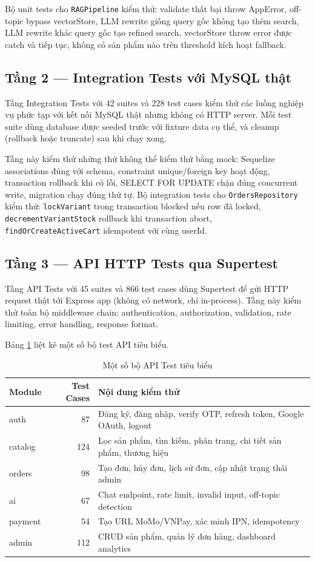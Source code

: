 Bộ unit tests cho \texttt{RAGPipeline} kiểm thử: validate thất bại throw AppError, off-topic bypass vectorStore, LLM rewrite giống query gốc không tạo thêm search, LLM rewrite khác query gốc tạo refined search, vectorStore throw error được catch và tiếp tục, không có sản phẩm nào trên threshold kích hoạt fallback.

\subsection{Tầng 2 — Integration Tests với MySQL thật}

Tầng Integration Tests với 42 suites và 228 test cases kiểm thử các luồng nghiệp vụ phức tạp với kết nối MySQL thật nhưng không có HTTP server. Mỗi test suite dùng database được seeded trước với fixture data cụ thể, và cleanup (rollback hoặc truncate) sau khi chạy xong.

Tầng này kiểm thử những thứ không thể kiểm thử bằng mock: Sequelize associations đúng với schema, constraint unique/foreign key hoạt động, transaction rollback khi có lỗi, SELECT FOR UPDATE chặn đúng concurrent write, migration chạy đúng thứ tự. Bộ integration tests cho \texttt{OrdersRepository} kiểm thử: \texttt{lockVariant} trong transaction blocked nếu row đã locked, \texttt{decrementVariantStock} rollback khi transaction abort, \texttt{findOrCreateActiveCart} idempotent với cùng userId.

\subsection{Tầng 3 — API HTTP Tests qua Supertest}

Tầng API Tests với 45 suites và 866 test cases dùng Supertest để gửi HTTP request thật tới Express app (không có network, chỉ in-process). Tầng này kiểm thử toàn bộ middleware chain: authentication, authorization, validation, rate limiting, error handling, response format.

Bảng \ref{tab:api-test-coverage} liệt kê một số bộ test API tiêu biểu.

\begin{table}[H]
\centering
\caption{Một số bộ API Test tiêu biểu}
\label{tab:api-test-coverage}
\begin{tabular}{|l|r|p{7cm}|}
\hline
\textbf{Module} & \textbf{Test Cases} & \textbf{Nội dung kiểm thử} \\
\hline
auth & 87 & Đăng ký, đăng nhập, verify OTP, refresh token, Google OAuth, logout \\
\hline
catalog & 124 & Lọc sản phẩm, tìm kiếm, phân trang, chi tiết sản phẩm, thương hiệu \\
\hline
orders & 98 & Tạo đơn, hủy đơn, lịch sử đơn, cập nhật trạng thái admin \\
\hline
ai & 67 & Chat endpoint, rate limit, invalid input, off-topic detection \\
\hline
payment & 54 & Tạo URL MoMo/VNPay, xác minh IPN, idempotency \\
\hline
admin & 112 & CRUD sản phẩm, quản lý đơn hàng, dashboard analytics \\
\hline
\end{tabular}
\end{table}

